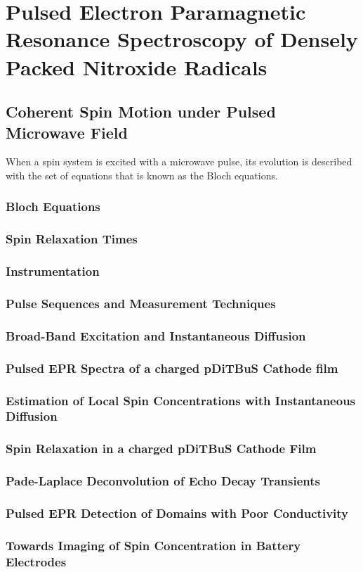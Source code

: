 \chapter{Pulsed Electron Paramagnetic Resonance Spectroscopy of Densely Packed Nitroxide Radicals}

\section{Coherent Spin Motion under Pulsed Microwave Field}
When a spin system is excited with a microwave pulse, its evolution is described with the set of equations that is known as the Bloch equations.
\subsection{Bloch Equations}
\subsection{Spin Relaxation Times}
\subsection{Instrumentation}
\subsection{Pulse Sequences and Measurement Techniques}
\subsection{Broad-Band Excitation and Instantaneous Diffusion}
\subsection{Pulsed EPR Spectra of a charged pDiTBuS Cathode film}
\subsection{Estimation of Local Spin Concentrations with Instantaneous Diffusion}
\subsection{Spin Relaxation in a charged pDiTBuS Cathode Film}
\subsection{Pade-Laplace Deconvolution of Echo Decay Transients}
\subsection{Pulsed EPR Detection of Domains with Poor Conductivity}
\subsection{Towards Imaging of Spin Concentration in Battery Electrodes}



